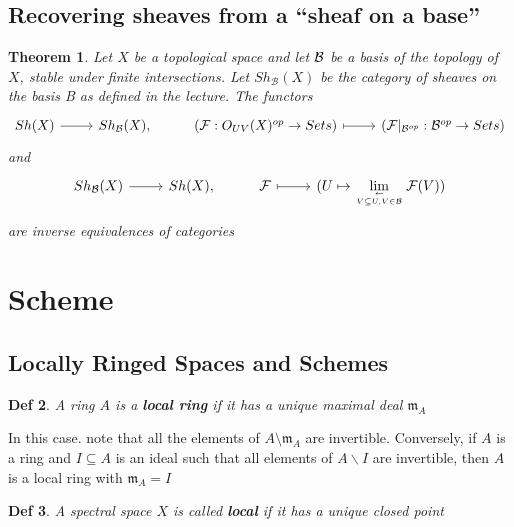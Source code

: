 \documentclass{article}
\newtheorem{theorem}{Theorem}[section]
\newtheorem{definition}[theorem]{Def}
\begin{document}
\newpage
\subsection{Recovering sheaves from a “sheaf on a base”}
\begin{theorem}
Let $X$ be a topological space and let $\cal B$ be a basis of the topology of $X$, stable under finite
intersections. Let $Sh_{\mathcal B}(X)$ be the category of sheaves on the basis B as defined in the lecture.
The functors
\[\begin{tikzcd}
	{Sh(X)} & {Sh_{\mathcal B}(X),} & {(\mathcal F:O_{UV}(X)^{op}\to Sets)} & {(\mathcal F|_{\mathcal B^{op}}:\mathcal B^{op}\to Sets)}
	\arrow[from=1-1, to=1-2]
	\arrow[maps to, from=1-3, to=1-4]
\end{tikzcd}\]
and
\[\begin{tikzcd}
	{Sh_{\mathcal B}(X)} & {Sh(X),} & {\mathcal F} & {(U\mapsto \lim\limits_{\leftarrow\atop {V\subseteq U, V\in\cal B}}\mathcal F(V))}
	\arrow[from=1-1, to=1-2]
	\arrow[maps to, from=1-3, to=1-4]
\end{tikzcd}\]
are inverse equivalences of categories
\end{theorem}





\newpage
\section{Scheme}
\subsection{Locally Ringed Spaces and Schemes}
\begin{definition}
    A ring $A$ is a \textbf{local ring} if it has a unique maximal deal $\mathfrak{m}_{A}$ 
\end{definition}

In this case. note that all the elements of $A\setminus\mathfrak{m}_{A}$ are invertible. Conversely, if $A$ is a ring and $I\subseteq A$ is an ideal such that all elements of $A\backslash I$ are invertible, then $A$ is a local ring with $\mathfrak{m}_{A}=I$ 

\begin{definition}
A spectral space $X$ is called \textbf{local} if it has a unique closed point
\end{definition}
 
\end{document}
